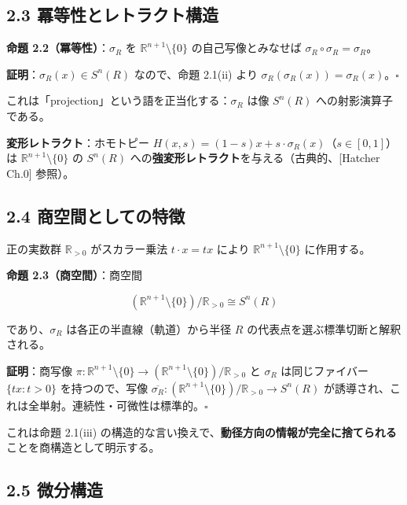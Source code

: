 \documentclass[
]{ltjsarticle}
\begin{document}
\subsection{2.3
冪等性とレトラクト構造}\label{ux51aaux7b49ux6027ux3068ux30ecux30c8ux30e9ux30afux30c8ux69cbux9020}

\textbf{命題 2.2（冪等性）}：\(\sigma_R\) を
\(\mathbb{R}^{n+1} \setminus \{0\}\) の自己写像とみなせば
\(\sigma_R \circ \sigma_R = \sigma_R\)。

\textbf{証明}：\(\sigma_R(x) \in S^n(R)\) なので、命題 2.1(ii) より
\(\sigma_R(\sigma_R(x)) = \sigma_R(x)\)。\(\square\)

これは「projection」という語を正当化する：\(\sigma_R\) は像 \(S^n(R)\)
への射影演算子である。

\textbf{変形レトラクト}：ホモトピー
\(H(x, s) = (1-s) x + s \cdot \sigma_R(x)\)（\(s \in [0, 1]\)）は
\(\mathbb{R}^{n+1} \setminus \{0\}\) の \(S^n(R)\)
への\textbf{強変形レトラクト}を与える（古典的、{[}Hatcher Ch.0{]}
参照）。

\subsection{2.4
商空間としての特徴}\label{ux5546ux7a7aux9593ux3068ux3057ux3066ux306eux7279ux5fb4}

正の実数群 \(\mathbb{R}_{>0}\) がスカラー乗法 \(t \cdot x = tx\) により
\(\mathbb{R}^{n+1} \setminus \{0\}\) に作用する。

\textbf{命題 2.3（商空間）}：商空間

\[(\mathbb{R}^{n+1} \setminus \{0\}) / \mathbb{R}_{>0} \cong S^n(R)\]

であり、\(\sigma_R\) は各正の半直線（軌道）から半径 \(R\)
の代表点を選ぶ標準切断と解釈される。

\textbf{証明}：商写像
\(\pi: \mathbb{R}^{n+1} \setminus \{0\} \to (\mathbb{R}^{n+1} \setminus \{0\}) / \mathbb{R}_{>0}\)
と \(\sigma_R\) は同じファイバー \(\{tx : t > 0\}\) を持つので、写像
\(\overline{\sigma_R}: (\mathbb{R}^{n+1} \setminus \{0\}) / \mathbb{R}_{>0} \to S^n(R)\)
が誘導され、これは全単射。連続性・可微性は標準的。\(\square\)

これは命題 2.1(iii)
の構造的な言い換えで、\textbf{動径方向の情報が完全に捨てられる}ことを商構造として明示する。

\subsection{2.5 微分構造}\label{ux5faeux5206ux69cbux9020}
\end{document}
